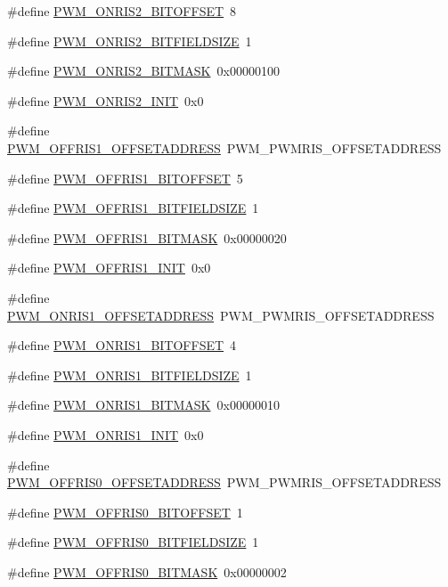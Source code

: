 \begin{DoxyCompactItemize}
\item 
\#define \hyperlink{a00565_ac4dcfd05963a3ee28d5dcf09579bc69b}{PWM\_\-ONRIS2\_\-BITOFFSET}~8
\item 
\#define \hyperlink{a00565_a17c7a2f0258dfa8c750292cb2ae87c6f}{PWM\_\-ONRIS2\_\-BITFIELDSIZE}~1
\item 
\#define \hyperlink{a00565_a98fe5375714720a916cc9441270e3f65}{PWM\_\-ONRIS2\_\-BITMASK}~0x00000100
\item 
\#define \hyperlink{a00565_ac51a141dd577d19955defa945ba8c71c}{PWM\_\-ONRIS2\_\-INIT}~0x0
\item 
\#define \hyperlink{a00565_aa0011d709ada1c8cb3b221053cdcd3ad}{PWM\_\-OFFRIS1\_\-OFFSETADDRESS}~PWM\_\-PWMRIS\_\-OFFSETADDRESS
\item 
\#define \hyperlink{a00565_af934a7197671bee73fc9acba848e4d94}{PWM\_\-OFFRIS1\_\-BITOFFSET}~5
\item 
\#define \hyperlink{a00565_a5fc0ddbfdc56442808b5de93ccd40fa0}{PWM\_\-OFFRIS1\_\-BITFIELDSIZE}~1
\item 
\#define \hyperlink{a00565_a557cb447f85354a11c7e11dacb5969f9}{PWM\_\-OFFRIS1\_\-BITMASK}~0x00000020
\item 
\#define \hyperlink{a00565_a5d41f39e164eb3d27dbbd432e35c3233}{PWM\_\-OFFRIS1\_\-INIT}~0x0
\item 
\#define \hyperlink{a00565_a48d8b9e83760dfe43c39030946285035}{PWM\_\-ONRIS1\_\-OFFSETADDRESS}~PWM\_\-PWMRIS\_\-OFFSETADDRESS
\item 
\#define \hyperlink{a00565_abee1b1081aee0ae78f8116b1b1076d7e}{PWM\_\-ONRIS1\_\-BITOFFSET}~4
\item 
\#define \hyperlink{a00565_a5ed91b07d94e8ef561da94f2914a1d7b}{PWM\_\-ONRIS1\_\-BITFIELDSIZE}~1
\item 
\#define \hyperlink{a00565_a4fff32a1d2f87b94371ebc9d2d41dc32}{PWM\_\-ONRIS1\_\-BITMASK}~0x00000010
\item 
\#define \hyperlink{a00565_a1993e53c914dc39f3f8ad4e54012819c}{PWM\_\-ONRIS1\_\-INIT}~0x0
\item 
\#define \hyperlink{a00565_ab4f4c6a7031c6cc75825ce5331678457}{PWM\_\-OFFRIS0\_\-OFFSETADDRESS}~PWM\_\-PWMRIS\_\-OFFSETADDRESS
\item 
\#define \hyperlink{a00565_a581825b5d80790f432ee8d6d5ed5c332}{PWM\_\-OFFRIS0\_\-BITOFFSET}~1
\item 
\#define \hyperlink{a00565_ae4c07c49aa63a2897740abfdb2994484}{PWM\_\-OFFRIS0\_\-BITFIELDSIZE}~1
\item 
\#define \hyperlink{a00565_a75da53217a98c663bc356f68f588a7bf}{PWM\_\-OFFRIS0\_\-BITMASK}~0x00000002

\end{DoxyCompactItemize}
